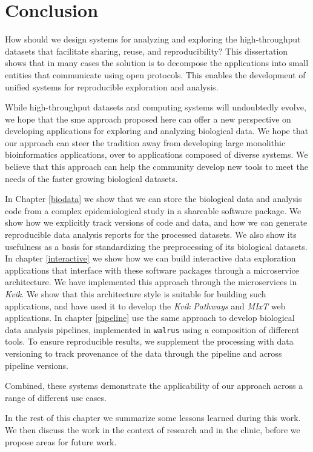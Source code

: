 \chapter{Conclusion}
How should we design systems for analyzing and exploring the high-throughput
datasets that facilitate sharing, reuse, and reproducibility? This dissertation
shows that in many cases the solution is to decompose the applications into
small entities that communicate using open protocols. This enables the
development of unified systems for reproducible exploration and analysis. 

While high-throughput datasets and computing systems will undoubtedly evolve, we
hope that the \gls{sme} approach proposed here can offer a new perspective on
developing applications for exploring and analyzing biological data. We hope
that our approach can steer the tradition away from developing large monolithic
bioinformatics applications, over to applications composed of diverse systems.
We believe that this approach can help the community develop new tools to meet
the needs of the faster growing biological datasets. 

In Chapter \ref{biodata} we show that we can store the biological data and
analysis code from a complex epidemiological study in a shareable software
package. We show how we explicitly track versions of code and data, and how we
can generate reproducible data analysis reports for the processed datasets. We
also show its usefulness as a basis for standardizing the preprocessing of its
biological datasets. In chapter \ref{interactive} we show how we can build
interactive data exploration applications that interface with these software
packages through a microservice architecture. We have implemented this approach
through the microservices in \emph{Kvik}. We show that this architecture style
is suitable for building such applications, and have used it to develop the
\emph{Kvik Pathways} and \emph{MIxT} web applications.  In chapter
\ref{pipeline} use the same approach to develop biological data analysis
pipelines, implemented in \texttt{walrus} using a composition of different
tools. To ensure reproducible results, we supplement the processing with data
versioning to track provenance of the data through the pipeline and across
pipeline versions. 

Combined, these systems demonstrate the applicability of our approach across a
range of different use cases. 

In the rest of this chapter we summarize some lessons learned during this
work. We then discuss the work in the context of research and in the clinic,
before we propose areas for future work. 



